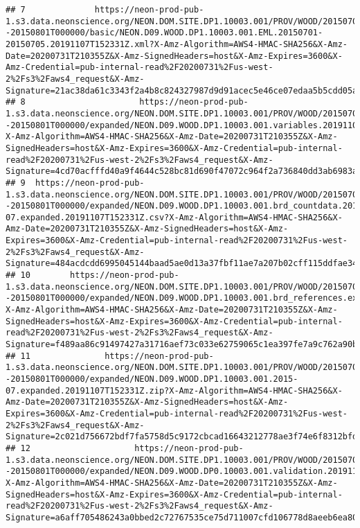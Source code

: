 \documentclass[]{book}
\begin{document}
\begin{verbatim}
## 7              https://neon-prod-pub-1.s3.data.neonscience.org/NEON.DOM.SITE.DP1.10003.001/PROV/WOOD/20150701T000000--20150801T000000/basic/NEON.D09.WOOD.DP1.10003.001.EML.20150701-20150705.20191107T152331Z.xml?X-Amz-Algorithm=AWS4-HMAC-SHA256&X-Amz-Date=20200731T210355Z&X-Amz-SignedHeaders=host&X-Amz-Expires=3600&X-Amz-Credential=pub-internal-read%2F20200731%2Fus-west-2%2Fs3%2Faws4_request&X-Amz-Signature=21ac38da61c3343f2a4b8c824327987d9d91acec5e46ce07edaa5b5cdd05a4ef
## 8                       https://neon-prod-pub-1.s3.data.neonscience.org/NEON.DOM.SITE.DP1.10003.001/PROV/WOOD/20150701T000000--20150801T000000/expanded/NEON.D09.WOOD.DP1.10003.001.variables.20191107T152331Z.csv?X-Amz-Algorithm=AWS4-HMAC-SHA256&X-Amz-Date=20200731T210355Z&X-Amz-SignedHeaders=host&X-Amz-Expires=3600&X-Amz-Credential=pub-internal-read%2F20200731%2Fus-west-2%2Fs3%2Faws4_request&X-Amz-Signature=4cd70acfffd40a9f4644c528bc81d690f47072c964f2a736840dd3ab6983a68a
## 9  https://neon-prod-pub-1.s3.data.neonscience.org/NEON.DOM.SITE.DP1.10003.001/PROV/WOOD/20150701T000000--20150801T000000/expanded/NEON.D09.WOOD.DP1.10003.001.brd_countdata.2015-07.expanded.20191107T152331Z.csv?X-Amz-Algorithm=AWS4-HMAC-SHA256&X-Amz-Date=20200731T210355Z&X-Amz-SignedHeaders=host&X-Amz-Expires=3600&X-Amz-Credential=pub-internal-read%2F20200731%2Fus-west-2%2Fs3%2Faws4_request&X-Amz-Signature=484acdcdd6995045144baad5ae0d13a37fbf11ae7a207b02cff115ddfae34dcf
## 10        https://neon-prod-pub-1.s3.data.neonscience.org/NEON.DOM.SITE.DP1.10003.001/PROV/WOOD/20150701T000000--20150801T000000/expanded/NEON.D09.WOOD.DP1.10003.001.brd_references.expanded.20191107T152331Z.csv?X-Amz-Algorithm=AWS4-HMAC-SHA256&X-Amz-Date=20200731T210355Z&X-Amz-SignedHeaders=host&X-Amz-Expires=3600&X-Amz-Credential=pub-internal-read%2F20200731%2Fus-west-2%2Fs3%2Faws4_request&X-Amz-Signature=f489aa86c91497427a31716aef73c033e62759065c1ea397fe7a9c762a90bee9
## 11               https://neon-prod-pub-1.s3.data.neonscience.org/NEON.DOM.SITE.DP1.10003.001/PROV/WOOD/20150701T000000--20150801T000000/expanded/NEON.D09.WOOD.DP1.10003.001.2015-07.expanded.20191107T152331Z.zip?X-Amz-Algorithm=AWS4-HMAC-SHA256&X-Amz-Date=20200731T210355Z&X-Amz-SignedHeaders=host&X-Amz-Expires=3600&X-Amz-Credential=pub-internal-read%2F20200731%2Fus-west-2%2Fs3%2Faws4_request&X-Amz-Signature=2c021d756672bdf7fa5758d5c9172cbcad16643212778ae3f74e6f8312bfd489
## 12                     https://neon-prod-pub-1.s3.data.neonscience.org/NEON.DOM.SITE.DP1.10003.001/PROV/WOOD/20150701T000000--20150801T000000/expanded/NEON.D09.WOOD.DP0.10003.001.validation.20191107T152331Z.csv?X-Amz-Algorithm=AWS4-HMAC-SHA256&X-Amz-Date=20200731T210355Z&X-Amz-SignedHeaders=host&X-Amz-Expires=3600&X-Amz-Credential=pub-internal-read%2F20200731%2Fus-west-2%2Fs3%2Faws4_request&X-Amz-Signature=a6aff705486243a0bbed2c72767535ce75d711007cfd106778d8aeeb6ea80b06

\end{verbatim}
\end{document}
